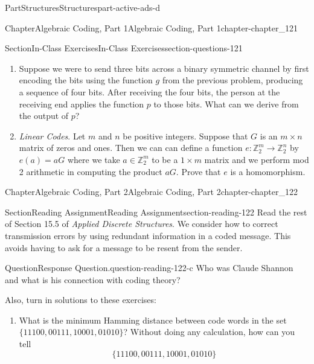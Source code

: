 \documentclass[oneside,10pt,]{book}
\numberwithin{equation}{section}
\begin{document}
\begin{partptx}{Part}{Structures}{}{Structures}{}{}{part-active-ads-d}
\begin{chapterptx}{Chapter}{Algebraic Coding, Part 1}{}{Algebraic Coding, Part 1}{}{}{chapter-chapter_121}
\begin{sectionptx}{Section}{In-Class Exercises}{}{In-Class Exercises}{}{}{section-questions-121}
\begin{enumerate}[label=\arabic*.]
\begin{enumerate}[label=(\alph*)]
\end{enumerate}
%
\item{}Suppose we were to send three bits across a binary symmetric channel by first encoding the bits using the function \(g\) from the previous problem, producing a sequence of four bits.   After receiving the four bits, the person at the receiving end applies the function \(p\) to those bits.   What can we derive from the output of \(p\)?%
\item{}\emph{Linear Codes}.  Let \(m\) and \(n\) be positive integers.  Suppose that \(G\) is an \(m \times n\) matrix of zeros and ones.  Then we can can define a function \(e:\mathbb{Z}_2^m \rightarrow \mathbb{Z}_2^n\) by \(e(a)=a G\) where we take \(a \in \mathbb{Z}_2^m\) to be a 	\(1\times m\) matrix and we perform mod 2 arithmetic in computing the product \(a G\).  Prove that \(e\) is a homomorphism.%
\end{enumerate}
%
\end{sectionptx}
\end{chapterptx}
%
\typeout{************************************************}
\typeout{************************************************}
%
\begin{chapterptx}{Chapter}{Algebraic Coding, Part 2}{}{Algebraic Coding, Part 2}{}{}{chapter-chapter_122}
\renewcommand*{\chaptername}{Chapter}
\index{}%
%
%
\typeout{************************************************}
\typeout{************************************************}
%
\begin{sectionptx}{Section}{Reading Assignment}{}{Reading Assignment}{}{}{section-reading-122}
Read the rest of  Section 15.5 of \emph{Applied Discrete Structures}.  We consider how to correct transmission errors by using redundant information in a coded message.  This avoids having to ask for a message to be resent from the sender.%
\begin{question}{Question}{Response Question.}{question-reading-122-c}%
Who was Claude Shannon and what is his connection with coding theory?%
\end{question}
Also, turn in solutions to these exercises:%
\begin{enumerate}[label=\arabic*.]
\item{}What is the minimum Hamming distance between code words in the set \(\{11100,00111,10001,01010\}\)? Without doing any calculation, how can you tell%
\begin{equation*}
\{11100,00111,10001,01010\}

\end{equation*}
\end{enumerate}
\end{sectionptx}
\end{chapterptx}
\end{partptx}
\end{document}
